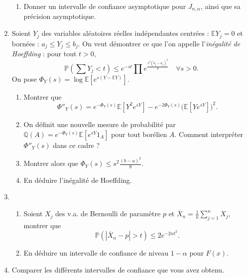 \begin{enumerate}
\begin{enumerate}
	\item Donner un intervalle de confiance asymptotique pour $J_{n,\alpha}$, ainsi que sa précision asymptotique.
	\end{enumerate}
\item Soient $Y_j$ des variables aléatoires réelles indépendantes centrées : $\mathbb E Y_j = 0 $ et bornées : $a_j \leq Y_j \leq b_j$. On veut démontrer ce que l'on appelle l'\textit{inégalité de Hoeffding} : pour tout $t>0$, 
\[\mathbb P(\sum Y_j <t )\leq e^{-st}\prod e^{\frac{s^2(b_j-a_j)^2}{8}}\quad\forall s >0.\]
On pose $\Phi_Y(s)=\log \mathbb E[e^{s(Y-\mathbb E Y)}]$. 
	\begin{enumerate}
	\item Montrer que \[\Phi''_Y(s)=e^{-\Phi_Y(s)}\mathbb E[Y^2 e^{sY}]-e^{-2\Phi_Y(s)}\mathbb (\mathbb E[Ye^{sY}])^2.\]
	\item On définit une nouvelle mesure de probabilité par $\mathbb Q(A)= e^{-\Phi_Y(s)}\mathbb E[e^{sY}1_A]$ pour tout borélien $A$. Comment interpréter $ \Phi''_Y(s)$ dans ce cadre ?
	\item Montrer alors que $\Phi_Y(s)\leq s^2 \frac{(b-a)^2}{8}$.
	\item En déduire l'inégalité de Hoeffding.
	\end{enumerate}

\item \begin{enumerate}
	\item Soient $X_j$ des v.a. de Bernoulli de paramètre $p$ et $\overline X_n = \frac{1}{n}\sum_{j=1}^n X_j$, montrer que 
		\[\mathbb P(|\overline X_n-p|>t)\leq 2e^{-2nt^2}.\] 
	\item En déduire un intervalle de confiance de niveau $1-\alpha$ pour $F(x)$.
	\end{enumerate}
\item Comparer les différents intervalles de confiance que vous avez obtenu.
\end{enumerate}

